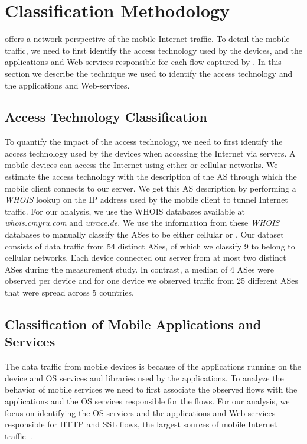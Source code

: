 \section{Classification Methodology}
\label{sec:classification-methodology}

\platname offers a network perspective of the mobile Internet traffic.
To detail the mobile traffic, we need to first identify the access technology used by the devices, and the applications and Web-services responsible for each flow captured by \platname.
In this section we describe the technique we used to identify the access technology and the applications and Web-services. 

\subsection{Access Technology Classification}

To quantify the impact of the access technology, we need to first identify the access technology used by the devices when accessing the Internet via \platname servers.
A mobile devices can access the Internet using either \wifi or cellular networks. 
We estimate the access technology with the description of the AS through which the mobile client connects to our \platname server. 
We get this AS description by performing a \emph{WHOIS} lookup on the IP address used by the mobile client to tunnel Internet traffic. 
For our analysis, we use the WHOIS databases available at \emph{whois.cmyru.com} and \emph{utrace.de}.
We use the information from these \emph{WHOIS} databases to manually classify the ASes to be either cellular or \wifi.
Our dataset consists of data traffic from 54 distinct ASes, of which we classify 9 to belong to cellular networks.
Each device connected our \platname server from at most two distinct ASes during the measurement study.
In contrast, a median of 4 \wifi ASes were observed per device and for one device we observed traffic from 25 different \wifi ASes that were spread across 5 countries. 

\subsection{Classification of Mobile Applications and Services}

The data traffic from mobile devices is because of the applications running on the device and OS services and libraries used by the applications. 
To analyze the behavior of mobile services we need to first associate the observed flows with the applications and the OS services responsible for the flows.
For our analysis, we focus on identifying the OS services and the applications and Web-services responsible for HTTP and SSL flows, the largest sources of mobile Internet traffic~\cite{maier:mobtraffic,falaki:mobileusage,xu:appusage}.

